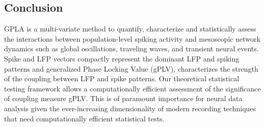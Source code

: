 \subsection*{Conclusion}
GPLA is a multi-variate method to quantify, characterize and statistically assess the interactions between population-level spiking activity and mesoscopic network dynamics such as global oscillations, traveling waves, and transient neural events.
Spike and LFP vectors compactly represent the dominant LFP and spiking patterns and  generalized Phase Locking Value (gPLV),
characterizes the strength of the coupling between LFP and spike patterns.
Our theoretical statistical testing framework allows a computationally efficient assessment of the significance of coupling measure gPLV.
This is of paramount importance for neural data analysis given the ever-increasing dimensionality of modern recording techniques that need computationally efficient statistical tests.




